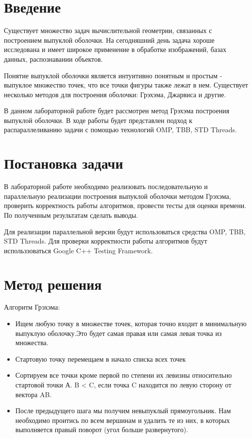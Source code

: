 \documentclass{report}
\begin{document}
\setcounter{page}{2}

\tableofcontents
\newpage

\section*{Введение}
Существует множество задач вычислительной геометрии, связанных с построением выпуклой оболочки. На сегодняшний день задача хороше исследована и имеет широкое применение в обработке изображений, базах данных, распознавании объектов.
\par Понятие выпуклой оболочки является интуитивно понятным и простым - выпуклое множество точек, что все точки фигуры также лежат в нем. Существует несколько методов для построения оболочки: Грэхэма, Джарвиса и другие.
\par В данном лабораторной работе будет рассмотрен метод Грэхэма построения выпуклой оболочки. В ходе работы будет представлен подход к распараллеливанию задачи с помощью технологий OMP, TBB, STD Threads.
\newpage

\section*{Постановка задачи}
В лабораторной работе необходимо реализовать последовательную и параллельную реализации построения выпуклой оболочки методом Грэхэма, проверить корректность работы алгоритмов, провести тесты для оценки времени. По полученным результатам сделать выводы.
\par Для реализации параллельной версии будут использоваться средства OMP, TBB, STD Threads. Для проверки корректности работы алгоритмов будут использзоваться Google C++ Testing Framework.
\newpage

\section*{Метод решения}
Алгоритм Грэхэма:
\begin{itemize}
\item Ищем любую точку в множестве точек, которая точно входит в минимальную выпуклую оболочку.Это будет самая правая или самая левая точка из множества.
\item Стартовую точку перемещаем в начало списка всех точек
\item Сортируем все точки кроме первой по степени их левизны относительно стартовой точки А. B < C, если точка C находится по левую сторону от вектора AB.
\item После предыдущего шага мы получим невыпуклый прямоугольник. Нам необходимо проитись по всем вершинам и удалить те из них, в которых выполняется правый поворот (угол больше развернутого).
\end{itemize}
\newpage
\end{document}
